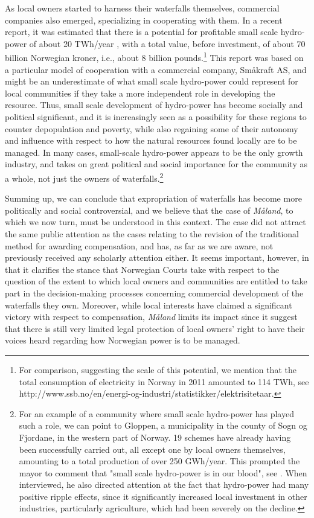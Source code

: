 As local owners started to harness their waterfalls themselves, commercial companies also emerged, specializing in cooperating with them. In a recent report, it was estimated that there is a potential for profitable small scale hydro-power of about 20 TWh/year \cite{Aanesland}, with a total value, before investment, of about 70 billion Norwegian kroner, i.e., about 8 billion pounds.\footnote{For comparison, suggesting the scale of this potential, we mention that the total consumption of electricity in Norway in 2011 amounted to 114 TWh, see http://www.ssb.no/en/energi-og-industri/statistikker/elektrisitetaar.}  This report was based on a particular model of cooperation with a commercial company, Småkraft AS, and might be an underestimate of what small scale hydro-power could represent for local communities if they take a more independent role in developing the resource. Thus, small scale development of hydro-power has become socially and political significant, and it is increasingly seen as a possibility for these regions to counter depopulation and poverty, while also regaining some of their autonomy and influence with respect to how the natural resources found locally are to be managed. In many cases, small-scale hydro-power appears to be the only growth industry, and takes on great political and social importance for the community as a whole, not just the owners of waterfalls.\footnote{For an example of a community where small scale hydro-power has played such a role, we can point to Gloppen, a municipality in the county of Sogn og Fjordane, in the western part of Norway. 19 schemes have already having been successfully carried out, all except one by local owners themselves, amounting to a total production of over 250 GWh/year. This prompted the mayor to comment that "small scale hydro-power is in our blood", see \cite{Gloppen}. When interviewed, he also directed attention at the fact that hydro-power had many positive ripple effects, since it significantly increased local investment in other industries, particularly agriculture, which had been severely on the decline.}

Summing up, we can conclude that expropriation of waterfalls has become more politically and social controversial, and we believe that the case of \emph{Måland}, to which we now turn, must be understood in this context. The case did not attract the same public attention as the cases relating to the revision of the traditional method for awarding compensation, and has, as far as we are aware, not previously received any scholarly attention either. It seems important, however, in that it clarifies the stance that Norwegian Courts take with respect to the question of the extent to which local owners and communities are entitled to take part in the decision-making processes concerning commercial development of the waterfalls they own. Moreover, while local interests have claimed a significant victory with respect to compensation, \emph{Måland} limits its impact since it suggest that there is still very limited legal protection of local owners' right to have their voices heard regarding how Norwegian power is to be managed.

